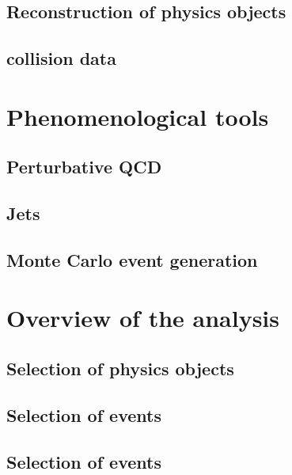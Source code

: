\documentclass[hyper,linkcolor=blue]{mythesis}
\begin{document}
\begin{mainmatter}
    \section{Reconstruction of physics objects}
      \label{sec:objects}
      
    \section{\pp collision data}
      \label{sec:dataset}
      

  \chapter{Phenomenological tools}
    \label{chap:tools}
    
    \section{Perturbative QCD}
      \label{sec:qcd}
      
    \section{Jets}
      \label{sec:jets}
      
    \section{Monte Carlo event generation}
      \label{sec:mc}
      
  
  \chapter{Overview of the \HWW analysis}
    \label{chap:selection}
    
    \section{Selection of physics objects}
      \label{sec:objects_hww}
      
    \section{Selection of \WW events}
      \label{sec:presel}
      
    \section{Selection of \HWW events}
      \label{sec:signalregions}
      


\end{mainmatter}
\end{document}
